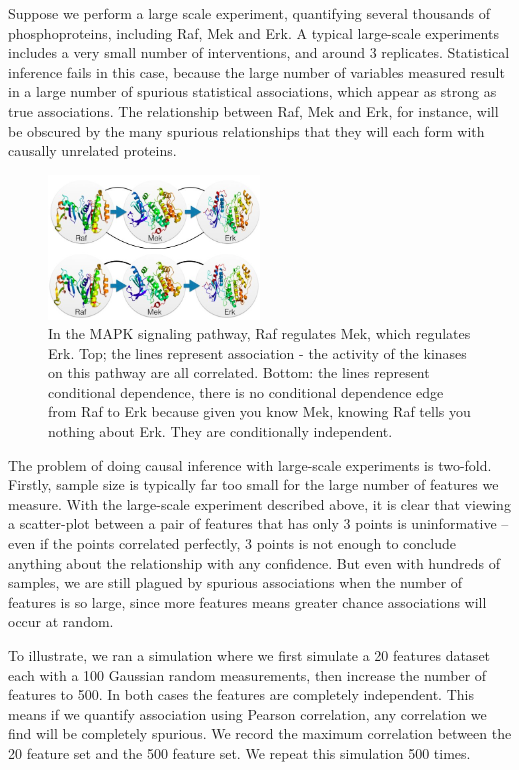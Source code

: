 \documentclass[journal=jacsat,manuscript=article]{achemso}
\begin{document}
Suppose we perform a large scale experiment, quantifying several
thousands of phosphoproteins, including Raf, Mek and Erk. A typical
large-scale experiments includes a very small number of interventions,
and around 3 replicates. Statistical inference fails in this case,
because the large number of variables measured result in a large number
of spurious statistical associations, which appear as strong as true
associations. The relationship between Raf, Mek and Erk, for instance,
will be obscured by the many spurious relationships that they will each
form with causally unrelated proteins.

\begin{figure}[!tpb]
\centerline{\includegraphics[width=0.5\textwidth]{figs/mapk.jpg}}
\caption{In the MAPK signaling pathway, Raf regulates Mek, which regulates
Erk. Top; the lines represent association - the activity of the kinases
on this pathway are all correlated. Bottom: the lines represent
conditional dependence, there is no conditional dependence edge from Raf
to Erk because given you know Mek, knowing Raf tells you nothing about
Erk. They are conditionally independent.}
\label{mapk}
\end{figure}

The problem of doing causal inference with large-scale experiments is
two-fold. Firstly, sample size is typically far too small for the large
number of features we measure. With the large-scale experiment described
above, it is clear that viewing a scatter-plot between a pair of
features that has only 3 points is uninformative -- even if the points
correlated perfectly, 3 points is not enough to conclude anything about
the relationship with any confidence. But even with hundreds of samples,
we are still plagued by spurious associations when the number of
features is so large, since more features means greater chance
associations will occur at random.

To illustrate, we ran a simulation where we first simulate a 20 features
dataset each with a 100 Gaussian random measurements, then increase the
number of features to 500. In both cases the features are completely
independent. This means if we quantify association using Pearson
correlation, any correlation we find will be completely spurious. We
record the maximum correlation between the 20 feature set and the 500
feature set. We repeat this simulation 500 times.
\end{document}
